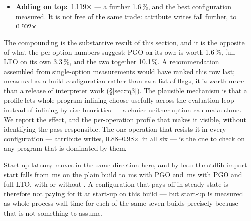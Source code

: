 \begin{itemize}[leftmargin=1.4em,itemsep=1pt]
        Only attribute writes get worse ($\meas{ratio:b5_buildcfg-plain:attr_set/plain|b5_buildcfg-pgo_ltofull:attr_set/pgo_ltofull}{0.928}\times$);  ($\meas{ratio:b5_buildcfg-plain:list_append/plain|b5_buildcfg-pgo_ltofull:list_append/pgo_ltofull}{0.990}\times$,
        $t=-3.86$) and  assignment ($\meas{ratio:b5_buildcfg-plain:dict_setitem/plain|b5_buildcfg-pgo_ltofull:dict_setitem/pgo_ltofull}{1.007}\times$, $t=4.21$) move by under $1\%$, both
        differences resolved by the test.
  \item \textbf{Adding  on top: $\meas{geomean:b5_buildcfg-plain|b5_buildcfg-pgo_ltofull_native}{1.119}\times$} --- a further 1.6\,\%, and
        the best configuration measured. It is not free of the same trade: attribute writes fall
        further, to $\meas{ratio:b5_buildcfg-plain:attr_set/plain|b5_buildcfg-pgo_ltofull_native:attr_set/pgo_ltofull_native}{0.902}\times$.
\end{itemize}

The compounding is the substantive result of this section, and it is the opposite of what the
per-option numbers suggest: PGO on its own is worth 1.6\,\%, full LTO on its own 3.3\,\%, and
the two together 10.1\,\%. A recommendation assembled from single-option measurements would
have ranked this row last; measured as a build configuration rather than as a list of flags, it
is worth more than a release of interpreter work (\S\ref{sec:rq3}). The plausible mechanism is
that a profile lets whole-program inlining choose usefully across the evaluation loop instead of
inlining by size heuristics --- a choice neither option can make alone. We
report the effect, and the per-operation profile that makes it visible, without identifying the
pass responsible. The one operation that resists it in every configuration --- attribute writes,
$0.88$--$\meas{ratio:b5_buildcfg-plain:attr_set/plain|b5_buildcfg-pgo:attr_set/pgo}{0.98}\times$ in all six --- is the one to check on any program that is dominated by
them.

Start-up latency moves in the same direction here, and by less: the stdlib-import start falls
from \,ms on the plain build to \,ms with PGO and \,ms with PGO and full LTO, with
or without . A configuration that pays off in steady state is therefore not
paying for it at start-up on this build --- but start-up is measured as whole-process wall time
for each of the same seven builds precisely because that is not something to assume.

